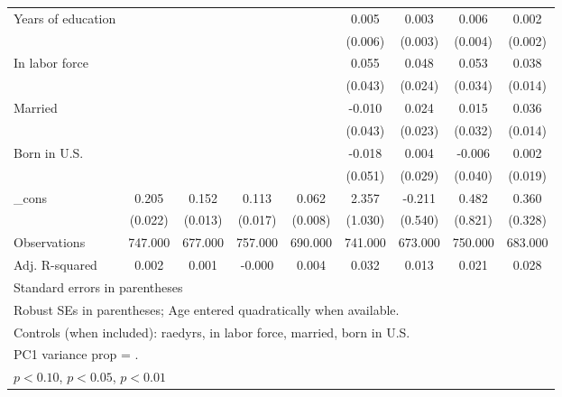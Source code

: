 \begin{table}[htbp]
\begin{tabular}{l*{8}{c}}
Years of education&                  &                  &                  &                  &    0.005         &    0.003         &    0.006         &    0.002         \\
          &                  &                  &                  &                  &  (0.006)         &  (0.003)         &  (0.004)         &  (0.002)         \\
In labor force&                  &                  &                  &                  &    0.055         &    0.048\sym{**} &    0.053         &    0.038\sym{***}\\
          &                  &                  &                  &                  &  (0.043)         &  (0.024)         &  (0.034)         &  (0.014)         \\
Married   &                  &                  &                  &                  &   -0.010         &    0.024         &    0.015         &    0.036\sym{***}\\
          &                  &                  &                  &                  &  (0.043)         &  (0.023)         &  (0.032)         &  (0.014)         \\
Born in U.S.&                  &                  &                  &                  &   -0.018         &    0.004         &   -0.006         &    0.002         \\
          &                  &                  &                  &                  &  (0.051)         &  (0.029)         &  (0.040)         &  (0.019)         \\
\_cons    &    0.205\sym{***}&    0.152\sym{***}&    0.113\sym{***}&    0.062\sym{***}&    2.357\sym{**} &   -0.211         &    0.482         &    0.360         \\
          &  (0.022)         &  (0.013)         &  (0.017)         &  (0.008)         &  (1.030)         &  (0.540)         &  (0.821)         &  (0.328)         \\
\midrule
Observations&  747.000         &  677.000         &  757.000         &  690.000         &  741.000         &  673.000         &  750.000         &  683.000         \\
Adj. R-squared&    0.002         &    0.001         &   -0.000         &    0.004         &    0.032         &    0.013         &    0.021         &    0.028         \\
\bottomrule
\multicolumn{9}{l}{\footnotesize Standard errors in parentheses}\\
\multicolumn{9}{l}{\footnotesize Robust SEs in parentheses; Age entered quadratically when available.}\\
\multicolumn{9}{l}{\footnotesize Controls (when included): raedyrs, in labor force, married, born in U.S.}\\
\multicolumn{9}{l}{\footnotesize PC1 variance prop =      .}\\
\multicolumn{9}{l}{\footnotesize \sym{*} \(p<0.10\), \sym{**} \(p<0.05\), \sym{***} \(p<0.01\)}\\
\end{tabular}
\end{table}

